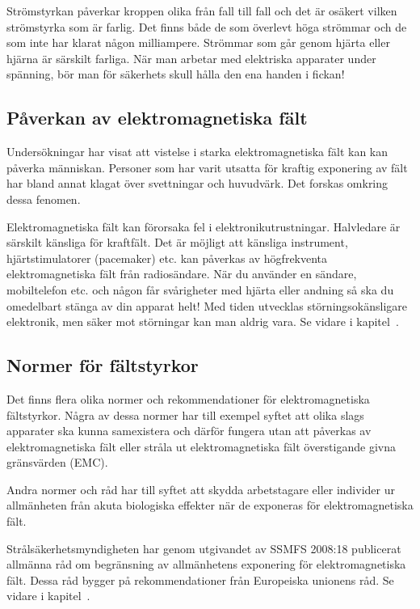Strömstyrkan påverkar kroppen olika från fall till fall och det är osäkert
vilken strömstyrka som är farlig.
Det finns både de som överlevt höga strömmar och de som inte har klarat någon
milliampere.
Strömmar som går genom hjärta eller hjärna är särskilt farliga.
När man arbetar med elektriska apparater under spänning, bör man för säkerhets
skull hålla den ena handen i fickan!

\subsection{Påverkan av elektromagnetiska fält}

Undersökningar har visat att vistelse i starka elektromagnetiska fält
kan kan påverka människan.
Personer som har varit utsatta för kraftig exponering av fält har bland annat
klagat över svettningar och huvudvärk.
Det forskas omkring dessa fenomen.

Elektromagnetiska fält kan förorsaka fel i elektronikutrustningar.
Halvledare är särskilt känsliga för kraftfält.
Det är möjligt att känsliga instrument, hjärtstimulatorer (pacemaker) etc. kan
påverkas av högfrekventa elektromagnetiska fält från radiosändare.
När du använder en sändare, mobiltelefon etc. och någon får svårigheter med
hjärta eller andning så ska du omedelbart stänga av din apparat helt!
Med tiden utvecklas störningsokänsligare elektronik, men säker mot störningar
kan man aldrig vara. Se vidare i kapitel~.

\subsection{Normer för fältstyrkor}

Det finns flera olika normer och rekommendationer för elektromagnetiska
fältstyrkor.
Några av dessa normer har till exempel syftet att olika slags apparater ska
kunna samexistera och därför fungera utan att påverkas av elektromagnetiska fält
eller stråla ut elektromagnetiska fält överstigande givna gränsvärden (EMC).

Andra normer och råd har till syftet att skydda arbetstagare eller individer
ur allmänheten från akuta biologiska effekter när de exponeras för
elektromagnetiska fält.

Strålsäkerhetsmyndigheten har genom utgivandet av SSMFS 2008:18 publicerat
allmänna råd om begränsning av allmänhetens exponering för elektromagnetiska
fält.
Dessa råd bygger på rekommendationer från Europeiska unionens råd.
Se vidare i kapitel~.
